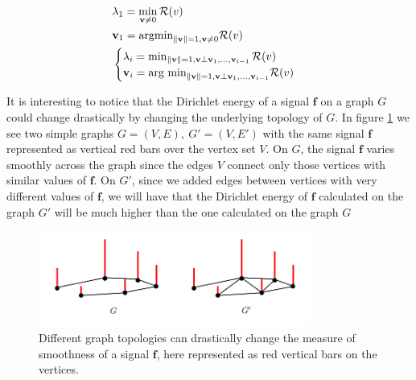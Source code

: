 \begin{equation}\label{eq:courantfisher}
	\begin{aligned} 
	&\lambda_1 = \min_{\mathbf v\neq 0} \mathcal R(v)\\
	&\mathbf v_1 = \text{argmin}_{\left\lVert\mathbf v\right\rVert = 1, \mathbf v\neq 0} \mathcal R(v)\\
	&\begin{cases}
	\lambda_i = \min_{\left\lVert\mathbf v\right\rVert = 1, \mathbf v\perp \mathbf v_1, ..., \mathbf v_{i-1}} \mathcal R(v)\\
	\mathbf v_i = \text{arg min}_{\left\lVert\mathbf v\right\rVert = 1, \mathbf v\perp \mathbf v_1, ..., \mathbf v_{i-1}}  \mathcal R(v)
	\end{cases}
	\end{aligned}	
\end{equation}
\begin{remark}
	It is interesting to notice that the Dirichlet energy of a signal $\mathbf f$ on a graph $G$ could change drastically by changing the underlying topology of $G$. In figure \ref{fig:graph} we see two simple graphs $G=(V, E),\ G' =(V, E')$ with the same signal $\mathbf f$ represented as vertical red bars over the vertex set $V$. On $G$, the signal $\mathbf f$ varies smoothly across the graph since the edges $V$ connect only those vertices with similar values of $\mathbf f$. On $G'$, since we added edges between vertices with very different values of $\mathbf f$, we will have that the Dirichlet energy of $\mathbf f$ calculated on the graph $G'$ will be much higher than the one calculated on the graph $G$
\end{remark}
\begin{figure}
	\centering
	\includegraphics[width=0.8\textwidth]{figs/chapter1/graph.png}
	\caption{\label{fig:graph}Different graph topologies can drastically change the measure of smoothness of a signal $\mathbf f$, here represented as red vertical bars on the vertices.}
\end{figure}

